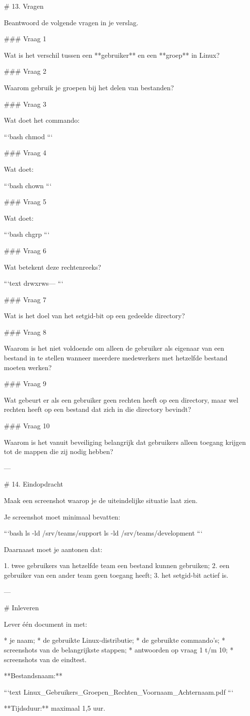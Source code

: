 # 13. Vragen

Beantwoord de volgende vragen in je verslag.

### Vraag 1

Wat is het verschil tussen een **gebruiker** en een **groep** in Linux?

### Vraag 2

Waarom gebruik je groepen bij het delen van bestanden?

### Vraag 3

Wat doet het commando:

```bash
chmod
```

### Vraag 4

Wat doet:

```bash
chown
```

### Vraag 5

Wat doet:

```bash
chgrp
```

### Vraag 6

Wat betekent deze rechtenreeks?

```text
drwxrws---
```

### Vraag 7

Wat is het doel van het setgid-bit op een gedeelde directory?

### Vraag 8

Waarom is het niet voldoende om alleen de gebruiker als eigenaar van een bestand in te stellen wanneer meerdere medewerkers met hetzelfde bestand moeten werken?

### Vraag 9

Wat gebeurt er als een gebruiker geen rechten heeft op een directory, maar wel rechten heeft op een bestand dat zich in die directory bevindt?

### Vraag 10

Waarom is het vanuit beveiliging belangrijk dat gebruikers alleen toegang krijgen tot de mappen die zij nodig hebben?

---

# 14. Eindopdracht

Maak een screenshot waarop je de uiteindelijke situatie laat zien.

Je screenshot moet minimaal bevatten:

```bash
ls -ld /srv/teams/support
ls -ld /srv/teams/development
```

Daarnaast moet je aantonen dat:

1. twee gebruikers van hetzelfde team een bestand kunnen gebruiken;
2. een gebruiker van een ander team geen toegang heeft;
3. het setgid-bit actief is.

---

# Inleveren

Lever één document in met:

* je naam;
* de gebruikte Linux-distributie;
* de gebruikte commando's;
* screenshots van de belangrijkste stappen;
* antwoorden op vraag 1 t/m 10;
* screenshots van de eindtest.

**Bestandsnaam:**

```text
Linux_Gebruikers_Groepen_Rechten_Voornaam_Achternaam.pdf
```

**Tijdsduur:** maximaal 1,5 uur.

